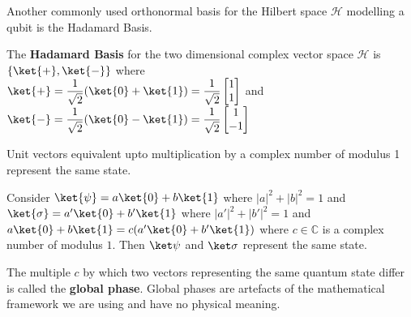 \vspace*{0.75cm}
Another commonly used orthonormal basis for the Hilbert space $\mathcal{H}$ modelling a qubit is the Hadamard Basis.

\begin{defn}
The \textbf{Hadamard Basis} for the two dimensional complex vector space $\mathcal{H}$ is  $\{ \ket{+}, \ket{-} \}$ where \\
    $\ket{+} = \displaystyle\frac{1}{\sqrt 2} (\ket{0} + \ket{1}) = \frac{1}{\sqrt{2}} \begin{bmatrix} 1 \\ 1 \end{bmatrix}$ and $\ket{-} = \displaystyle\frac{1}{\sqrt 2} (\ket{0} - \ket{1}) = \frac{1}{\sqrt{2}} \begin{bmatrix} 1 \\ -1 \end{bmatrix}$
\end{defn}

\begin{lemma}
    Unit vectors equivalent upto multiplication by a complex number of modulus 1 represent the same state.

    Consider $\ket{\psi} = a \ket{0} + b \ket{1}$ where $|a|^2 + |b|^2 = 1$ and $\ket{\sigma} = a' \ket{0} + b' \ket{1}$ where $|a'|^2 + |b'|^2 = 1$ and $a \ket{0} + b \ket{1} = c (a' \ket{0} + b' \ket{1})$ where $c \in \mathbb{C}$ is a complex number of modulus $1$. Then $\ket\psi$ and $\ket\sigma$ represent the same state.
\end{lemma}

The multiple $c$ by which two vectors representing the same quantum state differ is called the \textbf{global phase}. Global phases are artefacts of the mathematical framework we are using and have no physical meaning.
